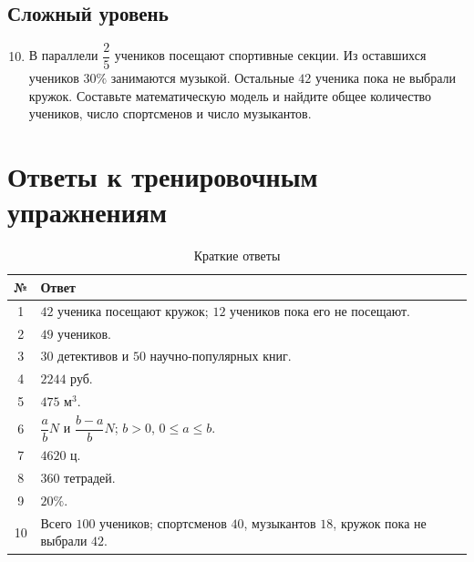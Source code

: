 \documentclass[a4paper,12pt]{article}
\begin{document}
\subsection*{Сложный уровень}

\begin{enumerate}
  \setcounter{enumi}{9}
  \item В параллели \(\dfrac{2}{5}\) учеников посещают спортивные секции. Из оставшихся учеников \(30\%\) занимаются музыкой. Остальные \(42\) ученика пока не выбрали кружок. Составьте математическую модель и найдите общее количество учеников, число спортсменов и число музыкантов.
\end{enumerate}

\clearpage
\section*{Ответы к тренировочным упражнениям}

\renewcommand{\arraystretch}{1.45}
\begin{table}[ht]
\centering
\caption{Краткие ответы}
\begin{tabularx}{\linewidth}{@{}cX@{}}
\toprule
\textbf{№} & \textbf{Ответ} \\
\midrule
1 & \(42\) ученика посещают кружок; \(12\) учеников пока его не посещают. \\
2 & \(49\) учеников. \\
3 & \(30\) детективов и \(50\) научно-популярных книг. \\
4 & \(2244\) руб. \\
5 & \(475\) м\(^3\). \\
6 & \(\dfrac{a}{b}N\) и \(\dfrac{b-a}{b}N\); \(b>0\), \(0\le a\le b\). \\
7 & \(4620\) ц. \\
8 & \(360\) тетрадей. \\
9 & \(20\%\). \\
10 & Всего \(100\) учеников; спортсменов \(40\), музыкантов \(18\), кружок пока не выбрали \(42\). \\
\bottomrule
\end{tabularx}
\end{table}
\end{document}
